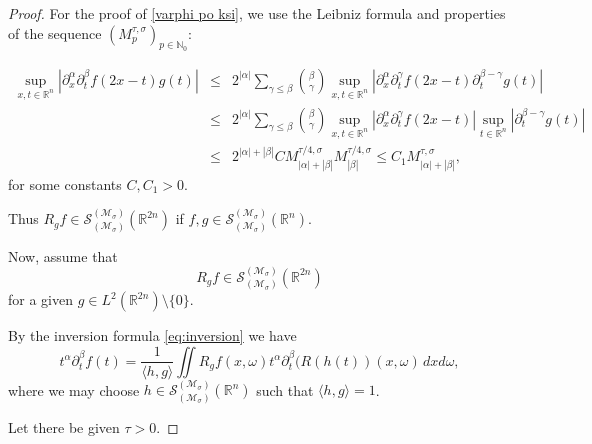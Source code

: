 \documentclass{article}
\theoremstyle{thmstyleone}
\theoremstyle{thmstyletwo}%
\theoremstyle{thmstylethree}%
\begin{document}
\begin{proof}


For the proof of  \eqref{varphi po ksi}, we use the Leibniz formula
and properties of the sequence $(M_{p}^{\tau,\sigma})_{p\in\mathbb N_0}$:

\begin{eqnarray*}
 \sup_{x,t \in \mathbb{R}^n} |\partial^\alpha _x \partial^\beta _t   f(2x-t) g (t)|
& \leq &
 2^{|\alpha|} \sum_{\gamma \leq \beta}
  \binom{\beta}{\gamma} 
\sup_{x,t \in \mathbb{R}^n} |\partial^{\alpha} _x \partial^{\gamma} _t  f (2x - t)
 \partial^{\beta - \gamma} _t g  (t)|
\\
& \leq & 2^{|\alpha| }  \sum_{\gamma \leq \beta}
  \binom{\beta}{\gamma} 
\sup_{x,t \in \mathbb{R}^n}
| \partial^{\alpha} _x \partial^{\gamma} _t  f (2x - t)|
\sup_{t \in \mathbb{R}^n} |\partial^{\beta - \gamma} _t g  (t)|
\\
& \leq & 2^{|\alpha| +|\beta|} 
C M^{\tau/4,\sigma}_{|\alpha |  +|\beta|}  
M^{\tau/4,\sigma}_{|\beta|} 
\leq  C_1 M^{\tau,\sigma}_{|\alpha |  +|\beta|}, 
\end{eqnarray*}
for some constants $C, C_1 > 0 $.

Thus $ R_g f \in \mathcal S_{(\mathcal{M}_\sigma )}^{(\mathcal{M}_\sigma)} (\mathbb R^{2n}) $ if  $f,g \in    \mathcal S_{(\mathcal{M}_\sigma )}^{(\mathcal{M}_\sigma)} (\mathbb R^{n}) .$


Now, assume that 
\begin{equation} \label{eq:RinGSspace}
R_g f \in  
\mathcal S_{(\mathcal{M}_\sigma )}^{(\mathcal{M}_\sigma)} (\mathbb R^{2n}) 
\end{equation}
for a given $g \in L^2 (\mathbb R^{2n}) \setminus \{ 0\}$.

By the inversion formula \eqref{eq:inversion}
we have
\begin{equation} \label{eq:term-for-estimate}
t^\alpha \partial^\beta _t f (t) = \frac{1}{\langle h, g \rangle} 
\iint R_{g} f (x, \omega)
t^\alpha \partial^\beta _t (R (h (t)) (x, \omega)\, dx d\omega,
\end{equation}
where we may choose $h \in \mathcal S_{(\mathcal{M}_\sigma )}^{(\mathcal{M}_\sigma)} (\mathbb R^{n})$ such that 
$\langle h, g \rangle = 1$.

Let there be given $\tau >0$.


\end{proof}
\end{document}
